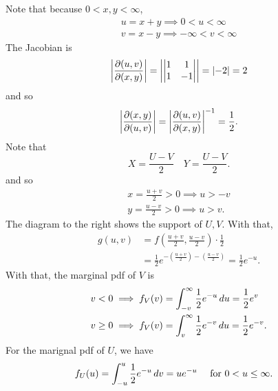 \documentclass[notoc,notitlepage]{tufte-book}
\begin{document}
\begin{solution}
  Note that because $0 < x, y < \infty$,
  \begin{gather*}
    u = x + y \implies 0 < u < \infty \\
    v = x - y \implies -\infty < v < \infty
  \end{gather*}
  The Jacobian is
  \begin{equation*}
    \left| \frac{\partial (u, v)}{\partial (x, y)} \right| = \left| \begin{vmatrix}
        1 & 1 \\
        1 & -1
    \end{vmatrix} \right| = \left|-2\right| = 2
  \end{equation*}
  and so
  \begin{equation*}
    \left| \frac{\partial(x, y)}{\partial (u, v)} \right| = \left| \frac{\partial (u, v)}{\partial (x, y)} \right|^{-1} = \frac{1}{2}.
  \end{equation*}
  Note that
  \begin{equation*}
    X = \frac{U - V}{2} \quad Y = \frac{U - V}{2}.
  \end{equation*}
  and so
  \begin{gather*}
    x = \frac{u + v}{2} > 0 \implies u > -v \\
    y = \frac{u - v}{2} > 0 \implies u > v.
  \end{gather*}
  The diagram to the right shows the support of $U, V$.
  With that,
  \begin{align*}
    g(u, v) &= f( \frac{u + v}{2}, \frac{u - v}{2} ) \cdot \frac{1}{2} \\
            &= \frac{1}{2} e^{- \left( \frac{u + v}{2} \right) - \left( \frac{u - v}{2} \right)} = \frac{1}{2} e^{-u}.
  \end{align*}
  With that, the marginal pdf of $V$ is
  \begin{align*}
    v < 0 \implies f_V(v) &= \int_{-v}^{\infty} \frac{1}{2} e^{-u} \mathop{}\!d{u} = \frac{1}{2} e^v \\
    v \geq 0 \implies f_V(v) &= \int_{v}^{\infty} \frac{1}{2} e^{-v} \mathop{}\!d{u} = \frac{1}{2} e^{-v}.
  \end{align*}
  For the marignal pdf of $U$, we have
  \begin{align*}
    f_U(u) &= \int_{-u}^{u} \frac{1}{2}e^{-u} \mathop{}\!d{v} = ue^{-u} \quad \text{ for } 0 < u \leq \infty.
  \end{align*}
\end{solution}
\end{document}

